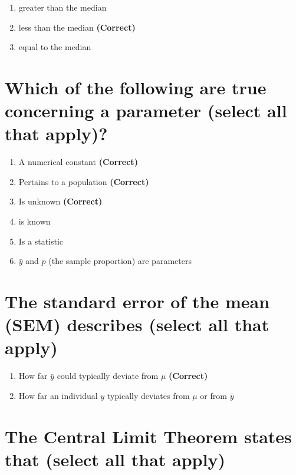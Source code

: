 \documentclass[letterpaper,10pt,twoside,printwatermark=false]{pinp}
\providecommand{\tightlist}{%
  \setlength{\itemsep}{0pt}\setlength{\parskip}{0pt}}
\begin{document}
\begin{enumerate}
\def\labelenumi{\arabic{enumi}.}
\tightlist
\item
  greater than the median
\item
  less than the median \textbf{(Correct)}
\item
  equal to the median
\end{enumerate}

\section{Which of the following are true concerning a parameter (select
all that
apply)?}\label{which-of-the-following-are-true-concerning-a-parameter-select-all-that-apply}

\begin{enumerate}
\def\labelenumi{\arabic{enumi}.}
\tightlist
\item
  A numerical constant \textbf{(Correct)}
\item
  Pertains to a population \textbf{(Correct)}
\item
  Is unknown \textbf{(Correct)}
\item
  is known
\item
  Is a statistic
\item
  \(\bar{y}\) and \(p\) (the sample proportion) are parameters
\end{enumerate}

\section{The standard error of the mean (SEM) describes (select all that
apply)}\label{the-standard-error-of-the-mean-sem-describes-select-all-that-apply}

\begin{enumerate}
\def\labelenumi{\arabic{enumi}.}
\tightlist
\item
  How far \(\bar{y}\) could typically deviate from \(\mu\)
  \textbf{(Correct)}
\item
  How far an individual \(y\) typically deviates from \(\mu\) or from
  \(\bar{y}\)
\end{enumerate}

\section{The Central Limit Theorem states that (select all that
apply)}\label{the-central-limit-theorem-states-that-select-all-that-apply}
\end{document}
